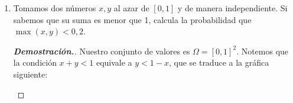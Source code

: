 \documentclass{article}
\newcommand{\R}{\mathbb R}
\begin{document}
\begin{enumerate}
		\begin{mdframed}[
			linecolor=darkgray,
			backgroundcolor=pearl]
			\begin{proof}[\textbf{Demostraci\'on.}]
				Nuestro conjunto de valores es $\Omega = [0,1]^2$. Queremos $b,c$ tal que \[ 4b^2-4c \geq 0. \] Esto es, que el discriminante del polinomio cuadr\'atico sea positivo. Como $b,c \geq 0$, la expresi\'on es equivalente a \[ b\geq \sqrt{c} \] con gr\'afica.
				 
				\begin{center}
				\end{center}
				
				Nos interesa el \'area arriba de la curva, que no sobrepase $b=1$. Es decir,
				\[  
					\int_0^q \sqrt{c} \;dc = \frac{2}{3}q^{3/2},
				\]
				donde $q\in \R_{+}$ es el punto tal que $\sqrt{q} = 1$. Por lo tanto, $q = 1$. Entonces, tenemos
				\[  
					\int_0^{1} \sqrt{c} \;dc = \frac{2}{3}.
				\]
				Entonces, el area arriba de la curva es
				\[  
				\int_0^{1} 1 - \sqrt{c}\; dc = 1 - \frac{2}{3} = \frac{1}{3}.
				\]
			\end{proof}
		\end{mdframed}
		
		\vspace{12pt}
		
		\item Tomamos dos n\'umeros $x, y$ al azar de $[0, 1]$ y de manera independiente. Si sabemos que su suma es menor que 1, calcula la probabilidad que $\max(x, y) < 0,2$.
		\begin{mdframed}[
			linecolor=darkgray,
			backgroundcolor=pearl]
			\begin{proof}[\textbf{Demostraci\'on.}]
				Nuestro conjunto de valores es $\Omega = [0,1]^2$. Notemos que la condici\'on $x+y<1$ equivale a $y<1-x$, que se traduce a la gr\'afica siguiente:
				
				\begin{center}
				\end{center}
				

\end{proof}
\end{mdframed}
\end{enumerate}
\end{document}

